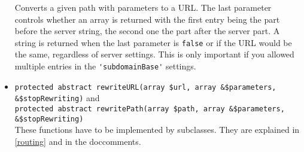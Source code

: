 \documentclass{scrartcl}
\begin{document}
\begin{itemize}
             Converts a given path with parameters to a URL. The last parameter controls whether an array is returned with the first entry being the part before the server string, the second one the part after the server part. A string is returned when the last parameter is \lstinline!false! or if the URL would be the same, regardless of server settings. This is only important if you allowed multiple entries in the \lstinline!'subdomainBase'! settings.
          \item \lstinline!protected abstract rewriteURL(array $url, array &$parameters, &$stopRewriting)! and \\ \lstinline!protected abstract rewritePath(array $path, array &$parameters, &$stopRewriting)! \\
             These functions have to be implemented by subclasses. They are explained in \autoref{routing} and in the doccomments.
      \end{itemize}
\end{document}
